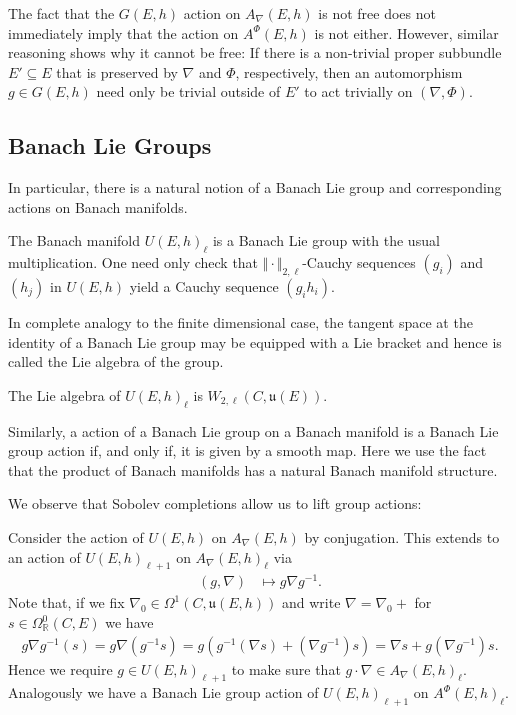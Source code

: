 \documentclass[12pt]{ociamthesis}  %
\begin{document}
\begin{example}\label{ex:not_free_double}
  The fact that the $G(E,h)$ action on $A_\nabla(E,h)$ is not free does not
  immediately imply that the action on $A^\Phi(E,h)$ is not either. However,
  similar reasoning shows why it cannot be free: If there is a non-trivial
  proper subbundle $E'\subseteq E$ that is preserved by $\nabla$ and $\Phi$,
  respectively, then an automorphism $g\in G(E,h)$ need only be trivial
  outside of $E'$ to act trivially on $(\nabla,\Phi)$.
\end{example}


\subsection{Banach Lie Groups}

In particular, there is a natural notion of a Banach Lie group and
corresponding actions on Banach manifolds.

\begin{example}
  The Banach manifold $U(E,h)_\ell$ is a Banach Lie group with the usual
  multiplication. One need only check that $\Vert\cdot\Vert_{2,\ell}$-Cauchy
  sequences $(g_i)$ and $(h_j)$ in $U(E,h)$ yield a Cauchy sequence
  $(g_ih_i)$.
\end{example}

In complete analogy to the finite dimensional case, the tangent space
at the identity of a Banach Lie group may be equipped with a Lie bracket
and hence is called the Lie algebra of the group.

\begin{example}
  The Lie algebra of $U(E,h)_\ell$ is $W_{2,\ell}(C,\mathfrak u(E))$.
\end{example}

Similarly, a action of a Banach Lie group on a Banach manifold
is a Banach Lie group action if, and only if, it is given by a
smooth map. Here we use the fact that the product of Banach manifolds
has a natural Banach manifold structure.

We observe that Sobolev completions allow us to lift group
actions:

\begin{example}
  Consider the action of $U(E,h)$ on $A_\nabla(E,h)$
  by conjugation. This extends to an action of $U(E,h)_{\ell+1}$
  on $A_\nabla(E,h)_\ell$ via
  \begin{align*}
    (g,\nabla) & \mapsto g\nabla g^{-1}.
  \end{align*}
  Note that, if we fix $\nabla_0\in\Omega^1(C,\mathfrak u(E,h))$ and write
  $\nabla = \nabla_0 + $
  for $s\in\Omega^0_{\mathbb{R}}(C,E)$ we have
  \begin{align*}
    g\nabla g^{-1}(s) = g\nabla(g^{-1}s) = g(g^{-1}(\nabla s) + (\nabla g^{-1})s)
    = \nabla s + g(\nabla g^{-1})s.
  \end{align*}
  Hence we require $g\in U(E,h)_{\ell + 1}$ to make sure that $g\cdot\nabla\in A_\nabla(E,h)_\ell$.
  Analogously we have a Banach Lie group action of $U(E,h)_{\ell+1}$
  on $A^\Phi (E,h)_\ell$.
\end{example}
\end{document}
